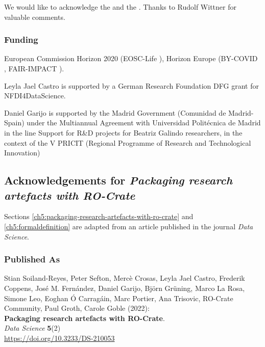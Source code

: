 We would like to acknowledge the
 and the
. Thanks to Rudolf Wittner for valuable comments.

\subsubsection*{Funding}

European Commission Horizon 2020 (EOSC-Life
), Horizon
Europe (BY-COVID
,
FAIR-IMPACT
).

Leyla Jael Castro is supported by a German Research Foundation DFG grant
for NFDI4DataScience.

Daniel Garijo is supported by the Madrid Government (Comunidad de
Madrid-Spain) under the Multiannual Agreement with Universidad
Politécnica de Madrid in the line Support for R\&D projects for Beatriz
Galindo researchers, in the context of the V PRICIT (Regional Programme
of Research and Technological Innovation)




\subsection{Acknowledgements for \emph{Packaging research artefacts with RO-Crate}}\label{ch11:packagingrocrate}

Sections \vref{ch5:packaging-research-artefacts-with-ro-crate} and \vref{ch5:formaldefinition} are adapted from an article published in the journal \emph{Data Science}.

\subsubsection*{Published As}

Stian Soiland-Reyes, Peter Sefton, Mercè Crosas, Leyla Jael Castro,
Frederik Coppens, José M. Fernández, Daniel Garijo, Björn Grüning, Marco
La Rosa, Simone Leo, Eoghan Ó Carragáin, Marc Portier, Ana Trisovic,
RO-Crate Community, Paul Groth, Carole Goble (2022):\\
\textbf{Packaging research artefacts with RO-Crate}.\\
\emph{Data Science} \textbf{5}(2)\\
\url{https://doi.org/10.3233/DS-210053}

